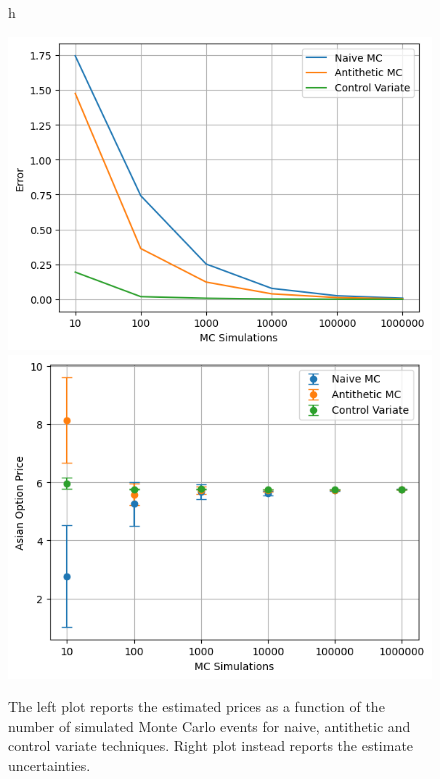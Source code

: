 \begin{figure}{h}
  \begin{center}
    \includegraphics[width=0.4\linewidth]{figures/asian_option_price}
    \includegraphics[width=0.4\linewidth]{figures/asian_option_error}
  \end{center}
  \caption{The left plot reports the estimated prices as a function of the number of simulated Monte Carlo events for naive, antithetic and control variate techniques.
    Right plot instead reports the estimate uncertainties.}
  \label{fig:asian_mc_results}
\end{figure}

%

\begin{thebibliography}{9}
\end{thebibliography}

